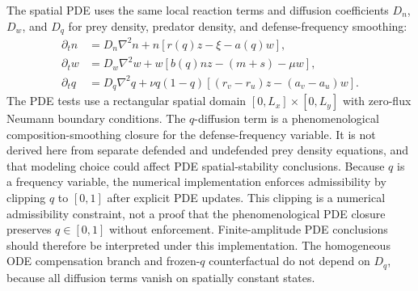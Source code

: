 \documentclass[11pt]{article}
\begin{document}
The spatial PDE uses the same local reaction terms and diffusion coefficients \(D_n\), \(D_w\), and \(D_q\) for prey density, predator density, and defense-frequency smoothing:
\begin{align}
\partial_t n &= D_n\nabla^2n+n[r(q)z-\xi-a(q)w],\\
\partial_t w &= D_w\nabla^2w+w[b(q)nz-(m+s)-\mu w],\\
\partial_t q &= D_q\nabla^2q+\nu q(1-q)[(r_v-r_u)z-(a_v-a_u)w].
\end{align}
The PDE tests use a rectangular spatial domain \([0,L_x]\times[0,L_y]\) with zero-flux Neumann boundary conditions. The \(q\)-diffusion term is a phenomenological composition-smoothing closure for the defense-frequency variable. It is not derived here from separate defended and undefended prey density equations, and that modeling choice could affect PDE spatial-stability conclusions. Because \(q\) is a frequency variable, the numerical implementation enforces admissibility by clipping \(q\) to \([0,1]\) after explicit PDE updates. This clipping is a numerical admissibility constraint, not a proof that the phenomenological PDE closure preserves \(q\in[0,1]\) without enforcement. Finite-amplitude PDE conclusions should therefore be interpreted under this implementation. The homogeneous ODE compensation branch and frozen-\(q\) counterfactual do not depend on \(D_q\), because all diffusion terms vanish on spatially constant states.
\end{document}
